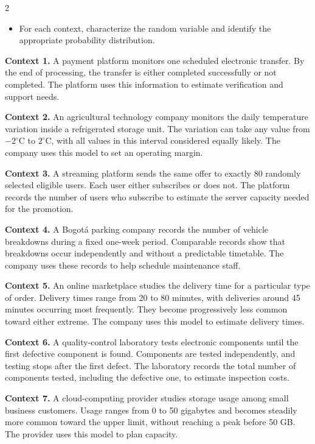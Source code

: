 \begin{multicols}{2}
{		\begin{itemize}
			\item[\textbf{(C1)}] For each context, characterize the random
			variable and identify the appropriate probability distribution.
		\end{itemize}
		
		\textbf{Context 1.} A payment platform monitors one scheduled
		electronic transfer. By the end of processing, the transfer is either
		completed successfully or not completed. The platform uses this information
		to estimate verification and support needs.
		
		\textbf{Context 2.} An agricultural technology company monitors the
		daily temperature variation inside a refrigerated storage unit. The
		variation can take any value from \(-2^\circ\mathrm{C}\) to
		\(2^\circ\mathrm{C}\), with all values in this interval considered
		equally likely. The company uses this model to set an operating margin.
		
		\textbf{Context 3.} A streaming platform sends the same offer to
		exactly 80 randomly selected eligible users. Each user either subscribes
		or does not. The platform records the number of users who subscribe to
		estimate the server capacity needed for the promotion.
		
		\textbf{Context 4.} A Bogotá parking company records the number of
		vehicle breakdowns during a fixed one-week period. Comparable records
		show that breakdowns occur independently and without a predictable
		timetable. The company uses these records to help schedule maintenance
		staff.
		
		\textbf{Context 5.} An online marketplace studies the delivery time
		for a particular type of order. Delivery times range from 20 to
		80 minutes, with deliveries around 45 minutes occurring most frequently.
		They become progressively less common toward either extreme. The
		company uses this model to estimate delivery times.
		
		\textbf{Context 6.} A quality-control laboratory tests electronic
		components until the first defective component is found. Components
		are tested independently, and testing stops after the first defect.
		The laboratory records the total number of components tested, including
		the defective one, to estimate inspection costs.
		
		\textbf{Context 7.} A cloud-computing provider studies storage usage
		among small business customers. Usage ranges from 0 to 50 gigabytes
		and becomes steadily more common toward the upper limit, without
		reaching a peak before 50 GB. The provider uses this model to plan
		capacity.
		
}
\end{multicols}
